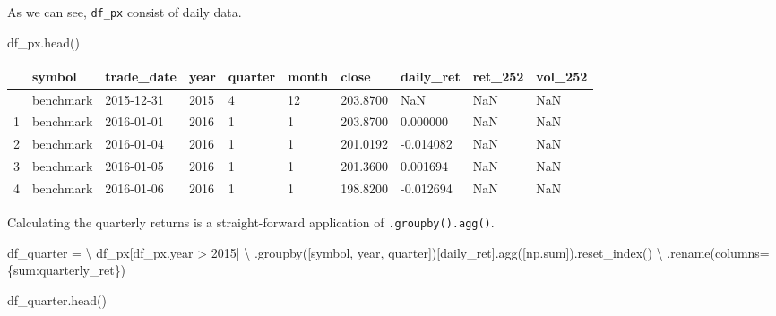 \documentclass[
  letterpaper,
  DIV=11,
  numbers=noendperiod]{scrreprt}
\newenvironment{Shaded}{\begin{snugshade}}{\end{snugshade}}
\newcommand{\BuiltInTok}[1]{\textcolor[rgb]{0.00,0.23,0.31}{#1}}
\newcommand{\DecValTok}[1]{\textcolor[rgb]{0.68,0.00,0.00}{#1}}
\newcommand{\NormalTok}[1]{\textcolor[rgb]{0.00,0.23,0.31}{#1}}
\newcommand{\OperatorTok}[1]{\textcolor[rgb]{0.37,0.37,0.37}{#1}}
\newcommand{\StringTok}[1]{\textcolor[rgb]{0.13,0.47,0.30}{#1}}
\begin{document}
As we can see, \texttt{df\_px} consist of daily data.

\begin{Shaded}
\begin{Highlighting}[]
\NormalTok{df\_px.head()}
\end{Highlighting}
\end{Shaded}

\begin{longtable}[]{@{}llllllllll@{}}
\toprule\noalign{}
& symbol & trade\_date & year & quarter & month & close & daily\_ret &
ret\_252 & vol\_252 \\
\midrule\noalign{}
\endhead
\bottomrule\noalign{}
\endlastfoot
0 & benchmark & 2015-12-31 & 2015 & 4 & 12 & 203.8700 & NaN & NaN &
NaN \\
1 & benchmark & 2016-01-01 & 2016 & 1 & 1 & 203.8700 & 0.000000 & NaN &
NaN \\
2 & benchmark & 2016-01-04 & 2016 & 1 & 1 & 201.0192 & -0.014082 & NaN &
NaN \\
3 & benchmark & 2016-01-05 & 2016 & 1 & 1 & 201.3600 & 0.001694 & NaN &
NaN \\
4 & benchmark & 2016-01-06 & 2016 & 1 & 1 & 198.8200 & -0.012694 & NaN &
NaN \\
\end{longtable}

Calculating the quarterly returns is a straight-forward application of
\texttt{.groupby().agg()}.

\begin{Shaded}
\begin{Highlighting}[]
\NormalTok{df\_quarter }\OperatorTok{=} \OperatorTok{\textbackslash{}}
\NormalTok{    df\_px[df\_px.year }\OperatorTok{\textgreater{}} \DecValTok{2015}\NormalTok{] }\OperatorTok{\textbackslash{}}
\NormalTok{        .groupby([}\StringTok{\textquotesingle{}symbol\textquotesingle{}}\NormalTok{, }\StringTok{\textquotesingle{}year\textquotesingle{}}\NormalTok{, }\StringTok{\textquotesingle{}quarter\textquotesingle{}}\NormalTok{])[}\StringTok{\textquotesingle{}daily\_ret\textquotesingle{}}\NormalTok{].agg([np.}\BuiltInTok{sum}\NormalTok{]).reset\_index() }\OperatorTok{\textbackslash{}}
\NormalTok{        .rename(columns}\OperatorTok{=}\NormalTok{\{}\StringTok{\textquotesingle{}sum\textquotesingle{}}\NormalTok{:}\StringTok{\textquotesingle{}quarterly\_ret\textquotesingle{}}\NormalTok{\})}

\NormalTok{df\_quarter.head()}
\end{Highlighting}
\end{Shaded}
\end{document}
